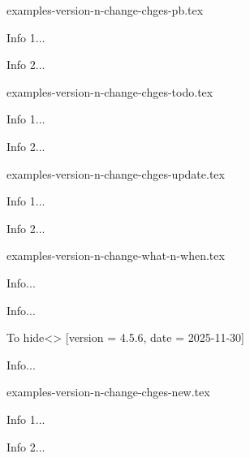 \begin{filecontents*}[overwrite]{examples-version-n-change-chges-pb.tex}
\begin{tdocprob}
    \item Info 1...
    \item Info 2...
\end{tdocprob}
\end{filecontents*}


\begin{filecontents*}[overwrite]{examples-version-n-change-chges-todo.tex}
\begin{tdoctodo}
    \item Info 1...
    \item Info 2...
\end{tdoctodo}
\end{filecontents*}


\begin{filecontents*}[overwrite]{examples-version-n-change-chges-update.tex}
\begin{tdocupdate}
    \item Info 1...
    \item Info 2...
\end{tdocupdate}
\end{filecontents*}


\begin{filecontents*}[overwrite]{examples-version-n-change-what-n-when.tex}
\begin{tdoctech}[date      = 2024-10-29,
                 col-chges = red]
    \item Info...
\end{tdoctech}

\begin{tdocupdate}[version   = 1.2.3,
                   col-chges = ForestGreen,
                   col       = ForestGreen]
    \item Info...
\end{tdocupdate}

\begin{tdoctopic}{To hide}<\faEyeSlash>%
                 [version = 4.5.6,
                  date    = 2025-11-30]
    \item Info...
\end{tdoctopic}
\end{filecontents*}


\begin{filecontents*}[overwrite]{examples-version-n-change-chges-new.tex}
\begin{tdocnew}
    \item Info 1...
    \item Info 2...
\end{tdocnew}
\end{filecontents*}


